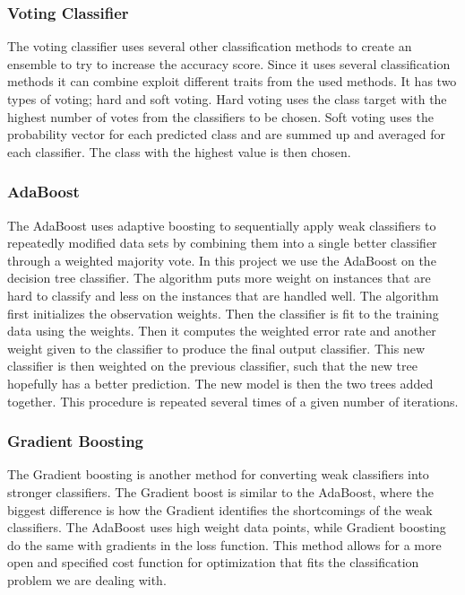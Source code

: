 \documentclass[12pt,a4paper,english]{article}
\begin{document}
\subsubsection{Voting Classifier}
\label{subsubsect:Vote}
The voting classifier uses several other classification methods to create an ensemble to try to increase the accuracy score. Since it uses several classification methods it can combine exploit different traits from the used methods. It has two types of voting; hard and soft voting. Hard voting uses the class target with the highest number of votes from the classifiers to be chosen. Soft voting uses the probability vector for each predicted class and are summed up and averaged for each classifier. The class with the highest value is then chosen. \cite{vote}

\subsubsection{AdaBoost}
\label{subsubsect:Ada}
The AdaBoost uses adaptive boosting to sequentially apply weak classifiers to repeatedly modified data sets by combining them into a single better classifier through a weighted majority vote. In this project we use the AdaBoost on the decision tree classifier. The algorithm puts more weight on instances that are hard to classify and less on the instances that are handled well. The algorithm first initializes the observation weights. Then the classifier is fit to the training data using the weights. Then it computes the weighted error rate and another weight given to the classifier to produce the final output classifier. This new classifier is then weighted on the previous classifier, such that the new tree hopefully has a better prediction. The new model is then the two trees added together. This procedure is repeated several times of a given number of iterations.  \cite{hastie2009}

\subsubsection{Gradient Boosting}
\label{subsubsect:Grad}
The Gradient boosting is another method for converting weak classifiers into stronger classifiers. The Gradient boost is similar to the AdaBoost, where the biggest difference is how the Gradient identifies the shortcomings of the weak classifiers. The AdaBoost uses high weight data points, while Gradient boosting do the same with gradients in the loss function. This method allows for a more open and specified cost function for optimization that fits the classification problem we are dealing with. \cite{hastie2009} 
\end{document}
